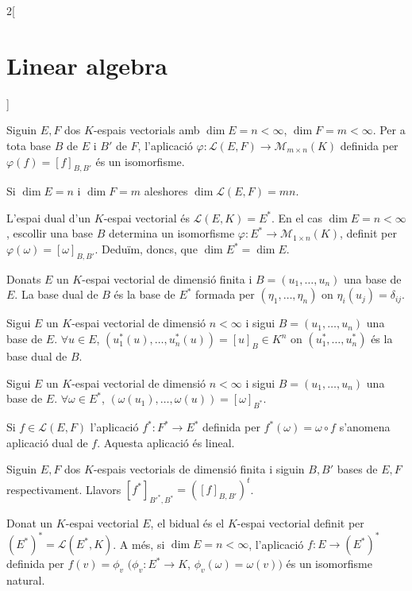 \documentclass[class=article,10pt,crop=false]{standalone}
\begin{document}
\begin{multicols}{2}[\section{Linear algebra}]
\begin{lemma}
\end{lemma}
\begin{prop}
Siguin $E,F$ dos $K$-espais vectorials amb $\dim E=n<\infty$, $\dim F=m<\infty$. Per a tota base $B$ de $E$ i $B'$ de $F$, l'aplicació $\varphi:\mathcal{L}(E,F)\rightarrow\mathcal{M}_{m\times n}(K)$ definida per $\varphi(f)=[f]_{B,B'}$ és un isomorfisme.
\end{prop}
\begin{corollary}
Si $\dim E=n$ i $\dim F=m$ aleshores $\dim \mathcal{L}(E,F)=mn$.
\end{corollary}
\begin{definition}
L'espai dual d'un $K$-espai vectorial és $\mathcal{L}(E,K)=E^*$. En el cas $\dim E=n<\infty$, escollir una base $B$ determina un isomorfisme $\varphi:E^*\rightarrow\mathcal{M}_{1\times n}(K)$, definit per $\varphi(\omega)=[\omega]_{B,B'}$. Deduïm, doncs, que $\dim E^*=\dim E$.
\end{definition}
\begin{definition}
Donats $E$ un $K$-espai vectorial de dimensió finita i $B=(u_1,\ldots,u_n)$ una base de $E$. La base dual de $B$ és la base de $E^*$ formada per $(\eta_1,\ldots,\eta_n)$ on $\eta_i(u_j)=\delta_{ij}$.
\end{definition}
\begin{lemma}
Sigui $E$ un $K$-espai vectorial de dimensió $n<\infty$ i sigui $B=(u_1,\ldots,u_n)$ una base de $E$. $\forall u\in E$, $(u_1^*(u),\ldots,u_n^*(u))=[u]_B\in K^n$ on $(u_1^*,\ldots,u_n^*)$ és la base dual de $B$.
\end{lemma}
\begin{lemma}
Sigui $E$ un $K$-espai vectorial de dimensió $n<\infty$ i sigui $B=(u_1,\ldots,u_n)$ una base de $E$. $\forall \omega\in E^*$, $(\omega(u_1),\ldots,\omega(u))=[\omega]_{B^*}$.
\end{lemma}
\begin{definition}
Si $f\in \mathcal{L}(E,F)$ l'aplicació $f^*:F^*\rightarrow E^*$ definida per $f^*(\omega)=\omega\circ f$ s'anomena aplicació dual de $f$. Aquesta aplicació és lineal.
\end{definition}
\begin{theorem}
Siguin $E,F$ dos $K$-espais vectorials de dimensió finita i siguin $B,B'$ bases de $E,F$ respectivament. Llavors $[f^*]_{B'^*,B^*}=([f]_{B,B'})^t$.
\end{theorem}
\begin{definition}
Donat un $K$-espai vectorial $E$, el bidual és el $K$-espai vectorial definit per $(E^*)^*=\mathcal{L}(E^*,K)$. A més, si $\dim E=n<\infty$, l'aplicació $f:E\rightarrow (E^*)^*$ definida per $f(v)=\phi_v$ $(\phi_v:E^*\rightarrow K$, $\phi_v(\omega)=\omega(v))$ és un isomorfisme natural. 

\end{definition}
\end{multicols}
\end{document}
